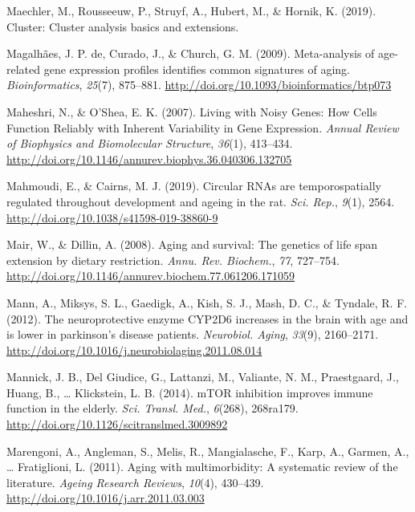 \documentclass[12pt,twoside]{unicam}
\begin{document}
\begin{cslreferences}
\leavevmode\hypertarget{ref-Maechler2019}{}%
Maechler, M., Rousseeuw, P., Struyf, A., Hubert, M., \& Hornik, K. (2019). Cluster: Cluster analysis basics and extensions.

\leavevmode\hypertarget{ref-deMagalhaes2009}{}%
Magalhães, J. P. de, Curado, J., \& Church, G. M. (2009). Meta-analysis of age-related gene expression profiles identifies common signatures of aging. \emph{Bioinformatics}, \emph{25}(7), 875--881. \url{http://doi.org/10.1093/bioinformatics/btp073}

\leavevmode\hypertarget{ref-Maheshri2007}{}%
Maheshri, N., \& O'Shea, E. K. (2007). Living with Noisy Genes: How Cells Function Reliably with Inherent Variability in Gene Expression. \emph{Annual Review of Biophysics and Biomolecular Structure}, \emph{36}(1), 413--434. \url{http://doi.org/10.1146/annurev.biophys.36.040306.132705}

\leavevmode\hypertarget{ref-Mahmoudi2019}{}%
Mahmoudi, E., \& Cairns, M. J. (2019). Circular RNAs are temporospatially regulated throughout development and ageing in the rat. \emph{Sci. Rep.}, \emph{9}(1), 2564. \url{http://doi.org/10.1038/s41598-019-38860-9}

\leavevmode\hypertarget{ref-Mair2008}{}%
Mair, W., \& Dillin, A. (2008). Aging and survival: The genetics of life span extension by dietary restriction. \emph{Annu. Rev. Biochem.}, \emph{77}, 727--754. \url{http://doi.org/10.1146/annurev.biochem.77.061206.171059}

\leavevmode\hypertarget{ref-Mann2012}{}%
Mann, A., Miksys, S. L., Gaedigk, A., Kish, S. J., Mash, D. C., \& Tyndale, R. F. (2012). The neuroprotective enzyme CYP2D6 increases in the brain with age and is lower in parkinson's disease patients. \emph{Neurobiol. Aging}, \emph{33}(9), 2160--2171. \url{http://doi.org/10.1016/j.neurobiolaging.2011.08.014}

\leavevmode\hypertarget{ref-Mannick2014}{}%
Mannick, J. B., Del Giudice, G., Lattanzi, M., Valiante, N. M., Praestgaard, J., Huang, B., \ldots{} Klickstein, L. B. (2014). mTOR inhibition improves immune function in the elderly. \emph{Sci. Transl. Med.}, \emph{6}(268), 268ra179. \url{http://doi.org/10.1126/scitranslmed.3009892}

\leavevmode\hypertarget{ref-Marengoni2011}{}%
Marengoni, A., Angleman, S., Melis, R., Mangialasche, F., Karp, A., Garmen, A., \ldots{} Fratiglioni, L. (2011). Aging with multimorbidity: A systematic review of the literature. \emph{Ageing Research Reviews}, \emph{10}(4), 430--439. \url{http://doi.org/10.1016/j.arr.2011.03.003}


\end{cslreferences}
\end{document}
